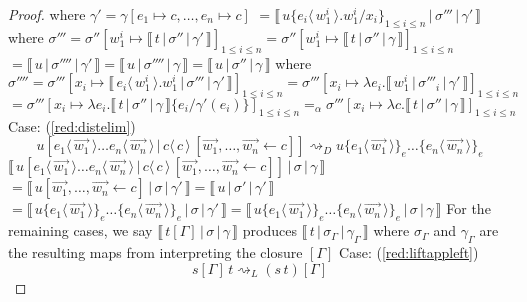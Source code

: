 \documentclass[a4paper,UKenglish,cleveref, autoref]{lipics-v2019}
\newcommand{\abs}[2]{\lambda #1 . #2}
\newcommand{\app}[2]{#1 \, #2}
\newcommand{\fake}[3]{#1 \langle \, #2 \, \rangle . #3}
\newcommand{\share}[3]{#1 [#2 \leftarrow #3]}
\newcommand{\dist}[5]{#1 [ #2 \, \vert \, \fakedist{#4}{#5} \, #3 ]}
\newcommand{\fakedist}[2]{#1 \langle \, #2 \, \rangle}
\newcommand{\sub}[3]{#1 \{ #2 / #3 \}}
\newcommand{\exor}[3]{#1 \{ \fakedist{#2}{#3} \}_{e}}
\newcommand{\readbackwmap}[3]{\llbracket \, #1 \, \vert \, #2 \, \vert \, #3  \, \rrbracket }
\begin{document}
\begin{proof}
\newline
where $\gamma' = \gamma[e_{1} \mapsto c, \dots, e_{n} \mapsto c]$
\newline
$= \readbackwmap{\sub{u}{\fake{e_{i}}{w^{i}_{1}}{w^{i}_{1}}}{x_{i}}_{1 \leq i \leq n}}{\sigma'''}{\gamma'}$
\newline
where $\sigma''' = \sigma'' [ w^{i}_{1} \mapsto \readbackwmap{t}{\sigma''}{\gamma'}]_{1 \leq i \leq n} = \sigma'' [w^{i}_{1} \mapsto \readbackwmap{t}{\sigma''}{\gamma}]_{1 \leq i \leq n}$
\newline
$= \readbackwmap{u}{\sigma''''}{\gamma'} = \readbackwmap{u}{\sigma''''}{\gamma}  = \readbackwmap{u}{\sigma''}{\gamma}$
\newline
where $\sigma'''' = \sigma''' [x_{i} \mapsto \readbackwmap{\fake{e_{i}}{w^{i}_{1}}{w^{i}_{1}}}{\sigma'''}{\gamma'}]_{1 \leq i \leq n} = \sigma''' [x_{i} \mapsto \abs{e_{i}}{\readbackwmap{w^{i}_{1}}{\sigma'''_{i}}{\gamma'}}]_{1 \leq i \leq n}$
\newline
\indent $= \sigma''' [x_{i} \mapsto \abs{e_{i}}{\readbackwmap{t}{\sigma''}{\gamma} \sub{}{e_{i}}{\gamma'(e_{i})}}]_{1 \leq i \leq n} =_{\alpha} \sigma''' [x_{i} \mapsto \abs{c}{\readbackwmap{t}{\sigma''}{\gamma}}]_{1 \leq i \leq n}$
\newline
\newline
Case: (\ref{red:distelim})
$$\dist{u}{\fakedist{e_{1}}{\vec{w_{1}}} \dots \fakedist{e_{n}}{\vec{w_{n}}}}{\share{}{\vec{w_{1}}, \dots, \vec{w_{n}}}{c}}{c}{c} \rightsquigarrow_{D} \exor{\exor{u}{e_{1}}{\vec{w_{1}}} \dots}{e_{n}}{\vec{w_{n}}}$$
$\readbackwmap{\dist{u}{\fakedist{e_{1}}{\vec{w_{1}}} \dots \fakedist{e_{n}}{\vec{w_{n}}}}{\share{}{\vec{w_{1}}, \dots, \vec{w_{n}}}{c}}{c}{c} }{\sigma}{\gamma}$
\newline
$= \readbackwmap{u \share{}{\vec{w_{1}}, \dots, \vec{w_{n}}}{c} }{\sigma}{\gamma'} = \readbackwmap{u}{\sigma'}{\gamma'} $
\newline
$= \readbackwmap{ \exor{\exor{u}{e_{1}}{\vec{w_{1}}} \dots}{e_{n}}{\vec{w_{n}}}}{\sigma}{\gamma'} = \readbackwmap{ \exor{\exor{u}{e_{1}}{\vec{w_{1}}} \dots}{e_{n}}{\vec{w_{n}}}}{\sigma}{\gamma}$
\newline
\newline
For the remaining cases, we say $\readbackwmap{t[\Gamma]}{\sigma}{\gamma}$ produces $\readbackwmap{t}{\sigma_{\Gamma}}{\gamma_{\Gamma}}$ where $\sigma_{\Gamma}$ and $\gamma_{\Gamma}$ are the resulting maps from interpreting the closure $[\Gamma]$
\newline
Case: (\ref{red:liftappleft})
$$\app{s[\Gamma]}{t} \rightsquigarrow_{L} (\app{s}{t})[\Gamma]$$

\end{proof}
\end{document}

